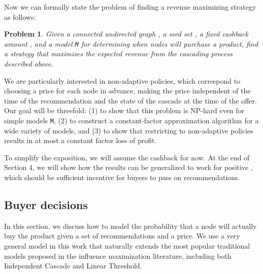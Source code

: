 \documentclass[letterpaper,twoside]{article}
\newtheorem{problem}{Problem}
\newcommand{\M}{\texttt{M}}
\begin{document}
Now we can formally state the problem of finding a revenue
maximizing strategy as follows:
\begin{problem} \label{problem:strategy}
  Given a connected undirected graph , a seed set , a
  fixed cashback amount , and a model \M{} for determining when
  nodes will purchase a product, find a strategy that
  maximizes the expected revenue from the cascading process
  described above.
\end{problem}
We are particularly interested in non-adaptive policies, which
correspond to choosing a price for each node in advance, making the price
independent of the time of the recommendation and the state of the cascade at
the time of the offer. Our goal
will be threefold: (1) to show that this problem is NP-hard even for
simple models \M, (2) to construct a constant-factor approximation
algorithm for a wide variety of models, and (3) to show that
restricting to non-adaptive policies results in at most a constant
factor loss of profit.

To simplify the exposition, we will assume the cashback  for
now. At the end of Section 4, we will show how the results can be
generalized to work for positive , which should be sufficient
incentive for buyers to pass on recommendations.

\subsection{Buyer decisions}
\label{sec:BuyerDecision}
In this section, we discuss how to model the probability that a node
will actually buy the product given a set of recommendations and a
price. We use a very general model in this work that naturally extends the most
popular traditional models proposed in the influence maximization literature, including both Independent Cascade and Linear
Threshold.
\end{document}
